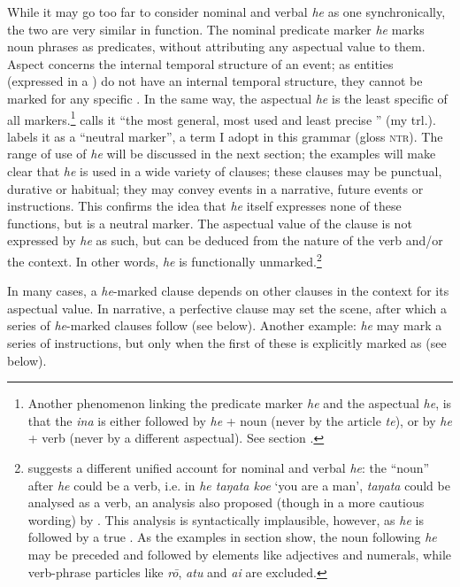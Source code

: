 While it may go too far to consider nominal and verbal \textit{he} as one  synchronically, the two are very similar in function. The nominal predicate marker \textit{he} marks noun phrases as predicates, without attributing any aspectual value to them. Aspect concerns the internal temporal structure of an event; as entities (expressed in a ) do not have an internal temporal structure, they cannot be marked for any specific . In the same way, the aspectual \textit{he} is the least specific of all  markers.\footnote{\label{fn:312}Another phenomenon linking the predicate marker \textit{he} and the aspectual \textit{he}, is that the  \textit{{\ꞌ}ina} is either followed by \textit{he} + noun (never by the article \textit{te}), or by \textit{he} + verb (never by a different aspectual). See section .} \citet[64]{Englert1978} calls it “the most general, most used and least precise ” (my trl.). \citet[153]{Chapin1978} labels it as a “neutral marker”, a term I adopt in this grammar (gloss \textsc{ntr}). The range of use of \textit{he} will be discussed in the next section; the examples will make clear that \textit{he} is used in a wide variety of clauses; these clauses may be punctual, durative or habitual; they may convey events in a narrative, future events or instructions. This confirms the idea that \textit{he} itself expresses none of these functions, but is a neutral marker. The aspectual value of the clause is not expressed by \textit{he} as such, but can be deduced from the nature of the verb and/or the context. In other words, \textit{he} is functionally unmarked.\footnote{\label{fn:313}\citet{Chapin1978} suggests a different unified account for nominal and verbal \textit{he}: the “noun” after \textit{he} could be a verb, i.e. in \textit{he taŋata koe} ‘you are a man’, \textit{taŋata} could be analysed as a verb, an analysis also proposed (though in a more cautious wording) by \citet[22]{FinneyAlexander1998}. This analysis is syntactically implausible, however, as \textit{he} is followed by a true . As the examples in section  show, the noun following \textit{he} may be preceded and followed by  elements like adjectives and numerals, while verb-phrase particles like \textit{rō}, \textit{atu} and \textit{{\ꞌ}ai} are excluded.}  

In many cases, a \textit{he}{}-marked clause depends on other clauses in the context for its aspectual value. In narrative, a perfective clause may set the scene, after which a series of \textit{he}{}-marked clauses follow (see  below). Another example: \textit{he} may mark a series of instructions, but only when the first of these is explicitly marked as  (see  below).

